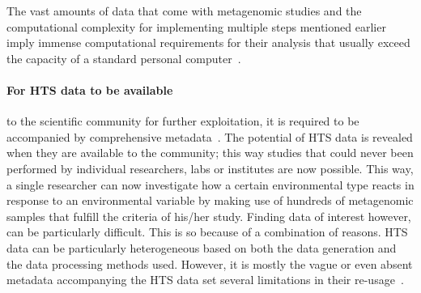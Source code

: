      The vast amounts of data that come with metagenomic studies and the computational complexity for implementing multiple steps mentioned earlier imply immense computational requirements for their analysis that usually exceed the capacity of a standard personal computer~\cite{merelli2014managing}. 

      \paragraph{For HTS data to be available }
      to the scientific community for further exploitation,
      it is required to be accompanied by
      comprehensive metadata~\cite{vangay2021microbiome}. 
      The potential of HTS data is revealed when they are available to the community; 
      this way studies that could never been performed
      by individual researchers, labs or institutes are now possible. 
      This way, 
      a single researcher can now investigate
      how a certain environmental type reacts in response to an environmental 
      variable by making use of hundreds of metagenomic samples 
      that fulfill the criteria of his/her study.
      Finding data of interest however, can be particularly difficult.
      This is so because of a combination of reasons.
      HTS data can be particularly heterogeneous based on both the data generation and the data processing methods used. 
      However, it is mostly the vague or even absent metadata accompanying the HTS data set several limitations in their re-usage~\cite{hu2022challenges}. 

